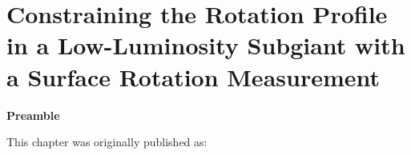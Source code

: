 
\chapter{Constraining the Rotation Profile in a Low-Luminosity Subgiant with a Surface Rotation Measurement}
\label{chap:subgiant_ast}



\textbf{Preamble}

This chapter was originally published as:
\begin{quote}
	\citet{tanner_ast}
\end{quote}


\newpage






